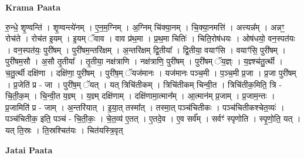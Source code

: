 \documentclass[17pt]{extarticle}
\begin{document}
\textbf{Krama Paata} \newline

रु॒न्धे॒ शृ॒ण्वन्ति॑ । शृ॒ण्वन्त्ये॑नम् । ए॒न॒म॒ग्निम् । अ॒ग्निम् चि॑क्या॒नम् । चि॒क्या॒नमत्ति॑ । अत्त्यन्न᳚म् । अन्नꣳ॒॒ रोच॑ते । रोच॑त इ॒यम् । इ॒यम् ॅवाव । वाव प्र॑थ॒मा । प्र॒थ॒मा चितिः॑ । चिति॒रोष॑धयः । ओष॑धयो॒ वन॒स्पत॑यः । वन॒स्पत॑यः॒ पुरी॑षम् । पुरी॑षम॒न्तरि॑क्षम् । अ॒न्तरि॑क्षम् द्वि॒तीया᳚ । द्वि॒तीया॒ वयाꣳ॑सि । वयाꣳ॑सि॒ पुरी॑षम् । पुरी॑षम॒सौ । अ॒सौ तृ॒तीया᳚ । तृ॒तीया॒ नक्ष॑त्राणि । नक्ष॑त्राणि॒ पुरी॑षम् । पुरी॑षम् ॅय॒ज्ञ्ः । य॒ज्ञ्श्च॑तु॒र्त्थी । च॒तु॒र्त्थी दक्षि॑णा । दक्षि॑णा॒ पुरी॑षम् । पुरी॑ष॒म् ॅयज॑मानः । यज॑मानः पञ्च॒मी । प॒ञ्च॒मी प्र॒जा । प्र॒जा पुरी॑षम् । प्र॒जेति॑ प्र - जा । पुरी॑ष॒म् ॅयत् । यत् त्रिचि॑तीकम् । त्रिचि॑तीकम् चिन्वी॒त । त्रिचि॑तीक॒मिति॒ त्रि - चि॒ती॒क॒म् । चि॒न्वी॒त य॒ज्ञ्म् । य॒ज्ञ्म् दक्षि॑णाम् । दक्षि॑णामा॒त्मान᳚म् । आ॒त्मान॑म् प्र॒जाम् । प्र॒जाम॒न्तः । प्र॒जामिति॑ प्र - जाम् । अ॒न्तरि॑यात् । इ॒या॒त् तस्मा᳚त् । तस्मा॒त् पञ्च॑चितीकः । पञ्च॑चितीकश्चेत॒व्यः॑ । पञ्च॑चितीक॒ इति॒ पञ्च॑ - चि॒ती॒कः॒ । चे॒त॒व्य॑ ए॒तत् । ए॒तदे॒व । ए॒व सर्व᳚म् । सर्वꣳ॑ स्पृणोति । स्पृ॒णो॒ति॒ यत् । यत् ति॒स्रः । ति॒स्रश्चित॑यः । चित॑यस्त्रि॒वृत् \newline

\textbf{Jatai Paata} \newline
\end{document}
